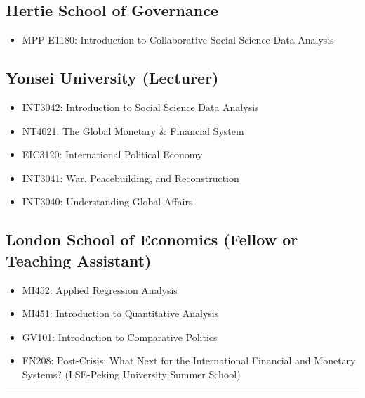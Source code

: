 \documentclass[a4paper]{article}
\begin{document}
{{\subsection*{Hertie School of Governance}

\begin{itemize}

    \item MPP-E1180: Introduction to Collaborative Social Science Data Analysis

\end{itemize}

\subsection*{Yonsei University (Lecturer)}

\begin{itemize}

	\item INT3042: Introduction to Social Science Data Analysis
	\item NT4021: The Global Monetary \& Financial System
	\item EIC3120: International Political Economy
	\item INT3041: War, Peacebuilding, and Reconstruction
	\item INT3040: Understanding Global Affairs

\end{itemize}

\subsection*{London School of Economics (Fellow or Teaching Assistant)}

\begin{itemize}
	\item MI452: Applied Regression Analysis
	\item MI451: Introduction to Quantitative Analysis
	\item GV101: Introduction to Comparative Politics
	\item FN208: Post-Crisis: What Next for the International Financial and Monetary Systems? (LSE-Peking University Summer School)
\end{itemize}

\vspace{0.25cm}
\medskip\hrule height 1pt
\vspace{0.5cm}

}}
\end{document}
